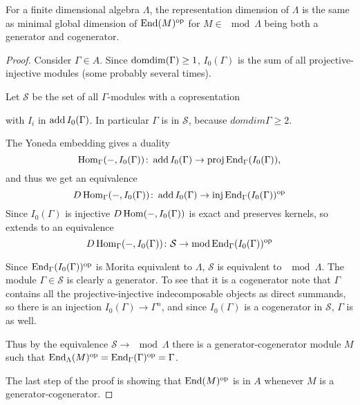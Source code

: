 \begin{prop}\label{prop:repdim_auslander_generator} 
	For a finite dimensional algebra $\Lambda$, the representation dimension of $\Lambda$ is the same as minimal global dimension of $\operatorname{End}(M)^{\operatorname{op}}$ for $M \in \mod\Lambda$ being both a generator and cogenerator. 
	\begin{proof}
		Consider $\Gamma \in A$. Since $\operatorname{domdim}(\Gamma) \geq 1$, $I_0(\Gamma)$ is the sum of all projective-injective modules (some probably several times). 
		
		Let $\mathcal S$ be the set of all $\Gamma$-modules with a copresentation
		\begin{center}
		\end{center}
		with $I_i$ in $\operatorname{add} I_0(\Gamma)$. In particular $\Gamma$ is in $\mathcal S$, because $domdim\Gamma \geq 2$.
		
		The Yoneda embedding gives a duality 
		$$\operatorname{Hom}_\Gamma(-,I_0(\Gamma))\colon\operatorname{add} I_0(\Gamma) \to \operatorname{proj}\operatorname{End}_\Gamma(I_0(\Gamma)),$$ 
		and thus we get an equivalence 
		$$D\operatorname{Hom}_\Gamma(-,I_0(\Gamma))\colon\operatorname{add} I_0(\Gamma) \to \operatorname{inj}\operatorname{End}_\Gamma(I_0(\Gamma))^{\operatorname{op}}$$
		Since $I_0(\Gamma)$ is injective $D\operatorname{Hom}(-,I_0(\Gamma))$ is exact and preserves kernels, so extends to an equivalence
		$$D\operatorname{Hom}_\Gamma(-,I_0(\Gamma))\colon\mathcal S \to \operatorname{mod} \operatorname{End}_\Gamma(I_0(\Gamma))^{\operatorname{op}}$$
		
		Since $\operatorname{End}_\Gamma(I_0(\Gamma))^{\operatorname{op}}$ is Morita equivalent to $\Lambda$, $\mathcal S$ is equivalent to $\mod \Lambda$. The module $\Gamma \in \mathcal S$ is clearly a generator. To see that it is a cogenerator note that $\Gamma$ contains all the projective-injective indecomposable objects as direct summands, so there is an injection $I_0(\Gamma) \to \Gamma^n$, and since $I_0(\Gamma)$ is a cogenerator in $\mathcal S$, $\Gamma$ is as well.
		
		Thus by the equivalence $\mathcal S \to \mod\Lambda$ there is a generator-cogenerator module $M$ such that $\operatorname{End}_\Lambda(M)^{\operatorname{op}} = \operatorname{End}_\Gamma(\Gamma)^{\operatorname{op}}=\Gamma$.
		
		The last step of the proof is showing that $\operatorname{End}(M)^{\operatorname{op}}$ is in $A$ whenever $M$ is a generator-cogenerator.
		

\end{proof}
\end{prop}
